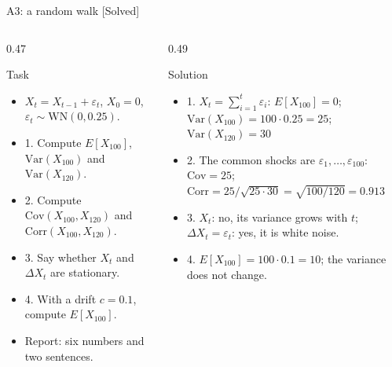 \begin{frame}{A3: a random walk [Solved]}
\itemsize{\scriptsize}
\begin{columns}[T]
\begin{column}{0.47\textwidth}
\begin{block}{Task}
\begin{itemize}
    \item $X_t = X_{t-1} + \varepsilon_t$, $X_0 = 0$, $\varepsilon_t \sim \mathrm{WN}(0, 0.25)$.
    \item 1. Compute $E[X_{100}]$, $\mathrm{Var}(X_{100})$ and $\mathrm{Var}(X_{120})$.
    \item 2. Compute $\mathrm{Cov}(X_{100}, X_{120})$ and $\mathrm{Corr}(X_{100}, X_{120})$.
    \item 3. Say whether $X_t$ and $\Delta X_t$ are stationary.
    \item 4. With a drift $c = 0.1$, compute $E[X_{100}]$.
    \item Report: six numbers and two sentences.
\end{itemize}
\end{block}
\end{column}
\begin{column}{0.49\textwidth}
\begin{exampleblock}{Solution}
\begin{itemize}
    \item 1. $X_t = \sum_{i=1}^{t}\varepsilon_i$: $E[X_{100}] = 0$; $\mathrm{Var}(X_{100}) = 100 \cdot 0.25 = 25$; $\mathrm{Var}(X_{120}) = 30$
    \item 2. The common shocks are $\varepsilon_1, \dots, \varepsilon_{100}$: $\mathrm{Cov} = 25$; $\mathrm{Corr} = 25/\sqrt{25 \cdot 30} = \sqrt{100/120} = 0.913$
    \item 3. $X_t$: no, its variance grows with $t$; $\Delta X_t = \varepsilon_t$: yes, it is white noise.
    \item 4. $E[X_{100}] = 100 \cdot 0.1 = 10$; the variance does not change.
\end{itemize}
\end{exampleblock}
\end{column}
\end{columns}
\end{frame}

